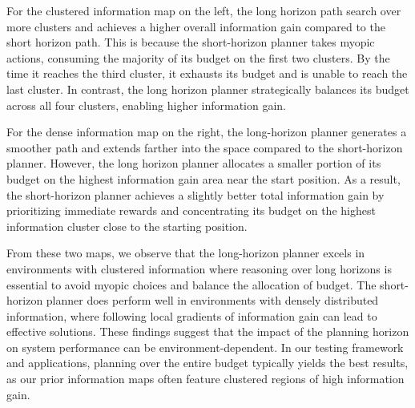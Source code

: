 For the clustered information map on the left, the long horizon path search over more clusters and achieves a higher overall information gain compared to the short horizon path. This is because the short-horizon planner takes myopic actions, consuming the majority of its budget on the first two clusters. By the time it reaches the third cluster, it exhausts its budget and is unable to reach the last cluster. In contrast, the long horizon planner strategically balances its budget across all four clusters, enabling higher information gain.

For the dense information map on the right, the long-horizon planner generates a smoother path and extends farther into the space compared to the short-horizon planner. However, the long horizon planner allocates a smaller portion of its budget on the highest information gain area near the start position. As a result, the short-horizon planner achieves a slightly better total information gain by prioritizing immediate rewards and concentrating its budget on the highest information cluster close to the starting position.  

From these two maps, we observe that the long-horizon planner excels in environments with clustered information where reasoning over long horizons is essential to avoid myopic choices and balance the allocation of budget. The short-horizon planner does perform well in environments with densely distributed information, where following local gradients of information gain can lead to effective solutions. These findings suggest that the impact of the planning horizon on system performance can be environment-dependent. In our testing framework and applications, planning over the entire budget typically yields the best results, as our prior information maps often feature clustered regions of high information gain.


